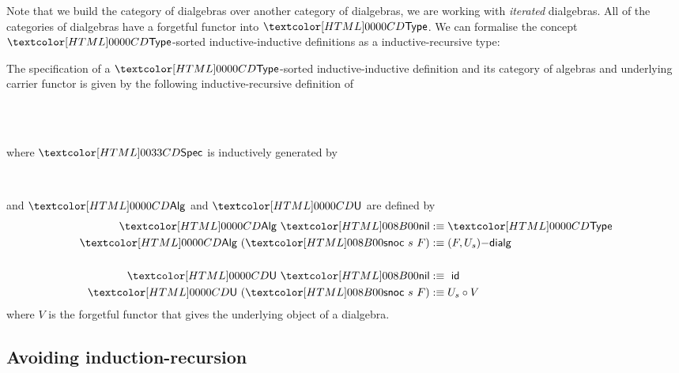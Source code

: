 Note that we build the category of dialgebras over another category of
dialgebras, \ie we are working with \emph{iterated} dialgebras. All of
the categories of dialgebras have a forgetful functor into $\Type$. We
can formalise the concept $\Type$-sorted inductive-inductive
definitions as a inductive-recursive type:
%
\begin{definition}
  The specification of a $\Type$-sorted inductive-inductive definition
  and its category of algebras and underlying carrier functor is given
  by the following inductive-recursive
  definition of
  \begin{sorts}
    \sortnamety{\specty}{\Type} \\
    \functy{\Alg}{\specty \to \Cat} \\
  \end{sorts}
  where $\specty$ is inductively generated by
  \begin{datatype}{\specty}{}
    \constr{\specnil}{\specty} \\
  \end{datatype}
  and $\Alg$ and $\Und$ are defined by
  \begin{align*}
    \Alg\ \specnil &\ddefeq \Type \\
    \Alg\ (\specsnoc\ s\ F) &\ddefeq \dialgcat{F}{U_s} \\
    \\
    \Und\ \specnil &\ddefeq\ \id \\
    \Und\ (\specsnoc\ s\ F) &\ddefeq U_s \circ V
  \end{align*}
  where $V$ is the forgetful functor that gives the underlying object of
  a dialgebra.
\end{definition}



\subsection{Avoiding induction-recursion}



